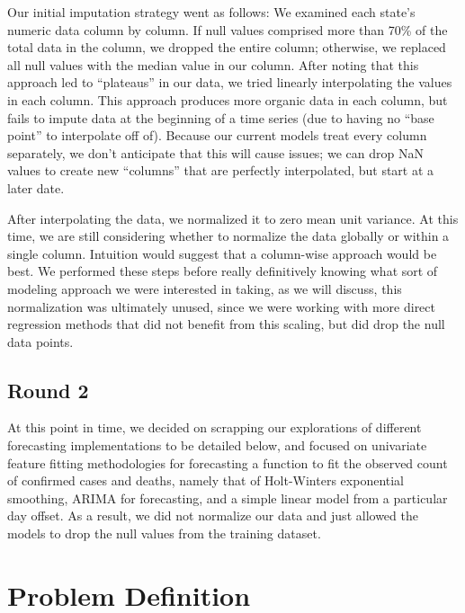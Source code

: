 \documentclass[sigconf,nonacm]{acmart}
\begin{document}
Our initial imputation strategy went as follows: We examined each state’s
numeric data column by column. If null values comprised more than 70\% of the
total data in the column, we dropped the entire column; otherwise, we replaced
all null values with the median value in our column. After noting that this
approach led to “plateaus” in our data, we tried linearly interpolating the
values in each column. This approach produces more organic data in each column,
but fails to impute data at the beginning of a time series (due to having no
“base point” to interpolate off of). Because our current models treat every
column separately, we don’t anticipate that this will cause issues; we can drop
NaN values to create new “columns” that are perfectly interpolated, but start
at a later date.  

After interpolating the data, we normalized it to zero mean unit variance. At
this time, we are still considering whether to normalize the data globally or
within a single column. Intuition would suggest that a column-wise approach
would be best. We performed these steps before really definitively knowing what
sort of modeling approach we were interested in taking, as we will discuss,
this normalization was ultimately unused, since we were working with more
direct regression methods that did not benefit from this scaling, but did drop
the null data points.

\subsection{Round 2}

At this point in time, we decided on scrapping our explorations of different
forecasting implementations to be detailed below, and focused on univariate
feature fitting methodologies for forecasting a function to fit the observed
count of confirmed cases and deaths, namely that of Holt-Winters exponential
smoothing, ARIMA for forecasting, and a simple linear model from a particular
day offset. As a result, we did not normalize our data and just allowed the
models to drop the null values from the training dataset.


\section{Problem Definition}

\end{document}

